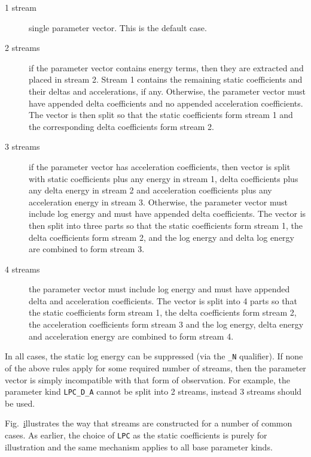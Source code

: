 \begin{description}
\item[1 stream] single parameter vector.  This is the default case.
\item[2 streams] if the parameter vector contains energy terms, then
     they are extracted and placed in stream 2.  Stream 1 contains the
     remaining static coefficients and their deltas and accelerations,
     if any.  Otherwise, 
     the parameter vector must have appended delta
     coefficients and no appended acceleration coefficients.  
     The vector is then split so that the static
     coefficients form stream 1 and
     the corresponding delta coefficients form stream 2.
\item[3 streams] 
     if the parameter vector has acceleration coefficients, then vector
     is split with static coefficients plus any energy in stream 1,
     delta coefficients plus any delta energy in stream 2 and
     acceleration coefficients plus any acceleration energy in stream 3.
     Otherwise, the parameter vector must include log energy and
     must have appended delta coefficients.  The vector is then split
     into three parts so that the static coefficients form stream
     1, the delta coefficients form stream 2, and the log energy
     and delta log energy are combined to form stream 3.  
\item[4 streams]
    the parameter vector must include log energy and
    must have appended delta and acceleration coefficients.
    The vector is split into 4 parts so that the static coefficients form stream
    1, the delta coefficients form stream 2, the acceleration
    coefficients form stream 3 and the log energy, delta energy
    and acceleration energy are combined to form stream 4.
\end{description}
In all cases, 
the static log energy can be 
suppressed (via the \texttt{\_N} qualifier).
If none of the above rules apply for some required number of
streams, then the parameter vector is simply incompatible with that
form of observation.  For example, the parameter kind \texttt{LPC\_D\_A}
cannot be split into 2 streams, instead 3 streams should be used.


Fig.~\href{f:streams} illustrates the way that streams are constructed
for a number of common cases.  As earlier, the choice of \texttt{LPC}
as the static coefficients is purely for illustration and the same
mechanism applies to all base parameter kinds.

